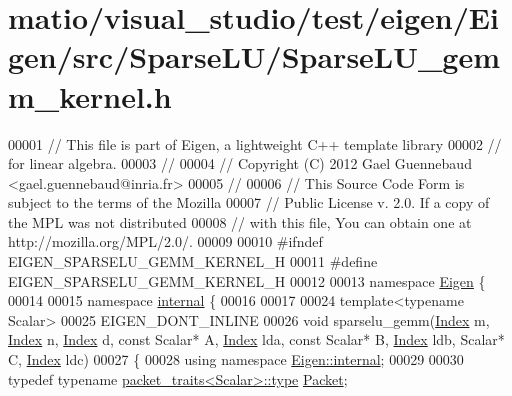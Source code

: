 \hypertarget{matio_2visual__studio_2test_2eigen_2_eigen_2src_2_sparse_l_u_2_sparse_l_u__gemm__kernel_8h_source}{}\section{matio/visual\+\_\+studio/test/eigen/\+Eigen/src/\+Sparse\+L\+U/\+Sparse\+L\+U\+\_\+gemm\+\_\+kernel.h}
\label{matio_2visual__studio_2test_2eigen_2_eigen_2src_2_sparse_l_u_2_sparse_l_u__gemm__kernel_8h_source}

\begin{DoxyCode}
00001 \textcolor{comment}{// This file is part of Eigen, a lightweight C++ template library}
00002 \textcolor{comment}{// for linear algebra.}
00003 \textcolor{comment}{//}
00004 \textcolor{comment}{// Copyright (C) 2012 Gael Guennebaud <gael.guennebaud@inria.fr>}
00005 \textcolor{comment}{//}
00006 \textcolor{comment}{// This Source Code Form is subject to the terms of the Mozilla}
00007 \textcolor{comment}{// Public License v. 2.0. If a copy of the MPL was not distributed}
00008 \textcolor{comment}{// with this file, You can obtain one at http://mozilla.org/MPL/2.0/.}
00009 
00010 \textcolor{preprocessor}{#ifndef EIGEN\_SPARSELU\_GEMM\_KERNEL\_H}
00011 \textcolor{preprocessor}{#define EIGEN\_SPARSELU\_GEMM\_KERNEL\_H}
00012 
00013 \textcolor{keyword}{namespace }\hyperlink{namespace_eigen}{Eigen} \{
00014 
00015 \textcolor{keyword}{namespace }\hyperlink{namespaceinternal}{internal} \{
00016 
00017 
00024 \textcolor{keyword}{template}<\textcolor{keyword}{typename} Scalar>
00025 EIGEN\_DONT\_INLINE
00026 \textcolor{keywordtype}{void} sparselu\_gemm(\hyperlink{namespace_eigen_a62e77e0933482dafde8fe197d9a2cfde}{Index} m, \hyperlink{namespace_eigen_a62e77e0933482dafde8fe197d9a2cfde}{Index} n, \hyperlink{namespace_eigen_a62e77e0933482dafde8fe197d9a2cfde}{Index} d, \textcolor{keyword}{const} Scalar* A, 
      \hyperlink{namespace_eigen_a62e77e0933482dafde8fe197d9a2cfde}{Index} lda, \textcolor{keyword}{const} Scalar* B, \hyperlink{namespace_eigen_a62e77e0933482dafde8fe197d9a2cfde}{Index} ldb, Scalar* C, \hyperlink{namespace_eigen_a62e77e0933482dafde8fe197d9a2cfde}{Index} ldc)
00027 \{
00028   \textcolor{keyword}{using namespace }\hyperlink{namespace_eigen_1_1internal}{Eigen::internal};
00029   
00030   \textcolor{keyword}{typedef} \textcolor{keyword}{typename} \hyperlink{struct_eigen_1_1internal_1_1packet__traits}{packet\_traits<Scalar>::type} \hyperlink{union_eigen_1_1internal_1_1_packet}{Packet};

\end{DoxyCode}
